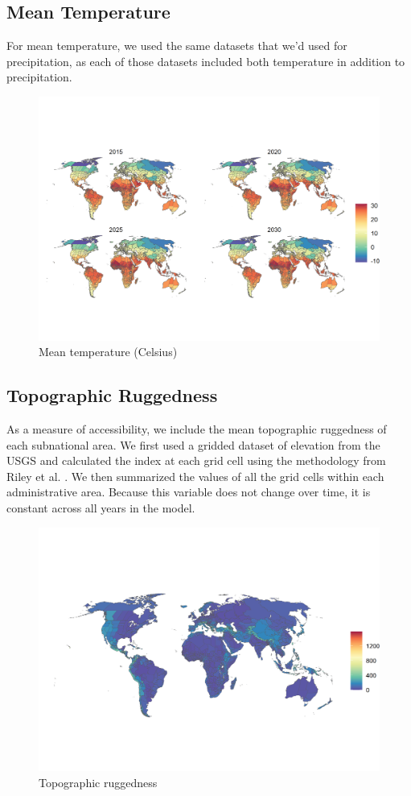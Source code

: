 \documentclass{article}
\begin{document}
\subsection{Mean Temperature}
For mean temperature, we used the same datasets that we'd used for precipitation, as each of those datasets included both temperature in addition to precipitation.

\begin{figure}[H]
  \centering
  \includegraphics[width=\linewidth]{img/covars/tave.png}
  \caption{Mean temperature (Celsius)}
\end{figure}

\subsection{Topographic Ruggedness}
As a measure of accessibility, we include the mean topographic ruggedness of each subnational area.  We first used a gridded dataset of elevation from the USGS \cite{USGS1996} and calculated the index at each grid cell using the methodology from Riley et al. \citep{Riley1999}.  We then summarized the values of all the grid cells within each administrative area.  Because this variable does not change over time, it is constant across all years in the model.

\begin{figure}[H]
  \centering
  \includegraphics[width=\linewidth]{img/covars/ruggedness.png}
  \caption{Topographic ruggedness}
\end{figure}
\end{document}
